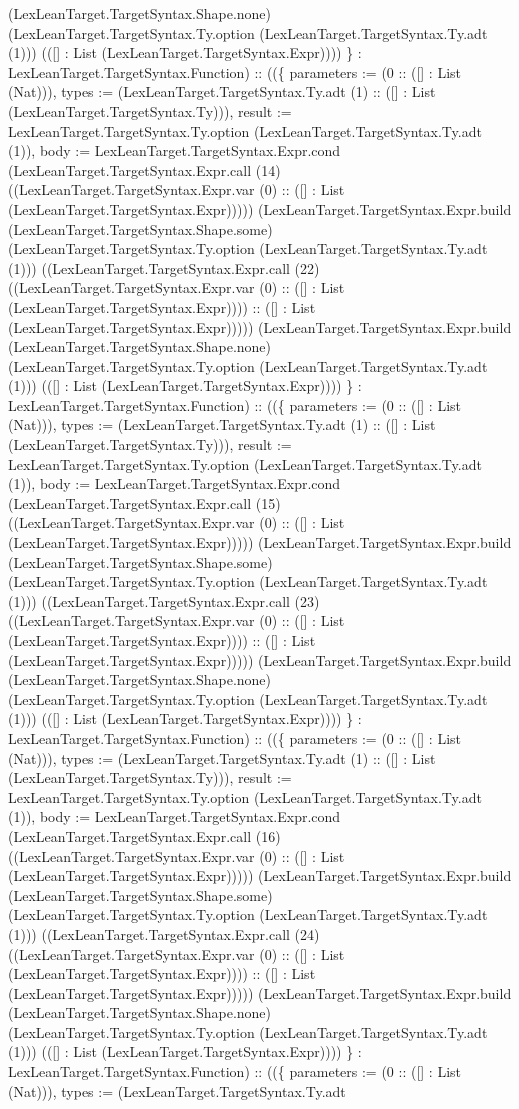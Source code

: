 \documentclass[11pt]{article}
\begin{document}
(LexLeanTarget.TargetSyntax.Shape.none) (LexLeanTarget.TargetSyntax.Ty.option (LexLeanTarget.TargetSyntax.Ty.adt (1))) (([] : List (LexLeanTarget.TargetSyntax.Expr)))) \} : LexLeanTarget.TargetSyntax.Function) :: ((\{ parameters := (0 :: ([] : List (Nat))), types := (LexLeanTarget.TargetSyntax.Ty.adt (1) :: ([] : List (LexLeanTarget.TargetSyntax.Ty))), result := LexLeanTarget.TargetSyntax.Ty.option (LexLeanTarget.TargetSyntax.Ty.adt (1)), body := LexLeanTarget.TargetSyntax.Expr.cond (LexLeanTarget.TargetSyntax.Expr.call (14) ((LexLeanTarget.TargetSyntax.Expr.var (0) :: ([] : List (LexLeanTarget.TargetSyntax.Expr))))) (LexLeanTarget.TargetSyntax.Expr.build (LexLeanTarget.TargetSyntax.Shape.some) (LexLeanTarget.TargetSyntax.Ty.option (LexLeanTarget.TargetSyntax.Ty.adt (1))) ((LexLeanTarget.TargetSyntax.Expr.call (22) ((LexLeanTarget.TargetSyntax.Expr.var (0) :: ([] : List (LexLeanTarget.TargetSyntax.Expr)))) :: ([] : List (LexLeanTarget.TargetSyntax.Expr))))) (LexLeanTarget.TargetSyntax.Expr.build (LexLeanTarget.TargetSyntax.Shape.none) (LexLeanTarget.TargetSyntax.Ty.option (LexLeanTarget.TargetSyntax.Ty.adt (1))) (([] : List (LexLeanTarget.TargetSyntax.Expr)))) \} : LexLeanTarget.TargetSyntax.Function) :: ((\{ parameters := (0 :: ([] : List (Nat))), types := (LexLeanTarget.TargetSyntax.Ty.adt (1) :: ([] : List (LexLeanTarget.TargetSyntax.Ty))), result := LexLeanTarget.TargetSyntax.Ty.option (LexLeanTarget.TargetSyntax.Ty.adt (1)), body := LexLeanTarget.TargetSyntax.Expr.cond (LexLeanTarget.TargetSyntax.Expr.call (15) ((LexLeanTarget.TargetSyntax.Expr.var (0) :: ([] : List (LexLeanTarget.TargetSyntax.Expr))))) (LexLeanTarget.TargetSyntax.Expr.build (LexLeanTarget.TargetSyntax.Shape.some) (LexLeanTarget.TargetSyntax.Ty.option (LexLeanTarget.TargetSyntax.Ty.adt (1))) ((LexLeanTarget.TargetSyntax.Expr.call (23) ((LexLeanTarget.TargetSyntax.Expr.var (0) :: ([] : List (LexLeanTarget.TargetSyntax.Expr)))) :: ([] : List (LexLeanTarget.TargetSyntax.Expr))))) (LexLeanTarget.TargetSyntax.Expr.build (LexLeanTarget.TargetSyntax.Shape.none) (LexLeanTarget.TargetSyntax.Ty.option (LexLeanTarget.TargetSyntax.Ty.adt (1))) (([] : List (LexLeanTarget.TargetSyntax.Expr)))) \} : LexLeanTarget.TargetSyntax.Function) :: ((\{ parameters := (0 :: ([] : List (Nat))), types := (LexLeanTarget.TargetSyntax.Ty.adt (1) :: ([] : List (LexLeanTarget.TargetSyntax.Ty))), result := LexLeanTarget.TargetSyntax.Ty.option (LexLeanTarget.TargetSyntax.Ty.adt (1)), body := LexLeanTarget.TargetSyntax.Expr.cond (LexLeanTarget.TargetSyntax.Expr.call (16) ((LexLeanTarget.TargetSyntax.Expr.var (0) :: ([] : List (LexLeanTarget.TargetSyntax.Expr))))) (LexLeanTarget.TargetSyntax.Expr.build (LexLeanTarget.TargetSyntax.Shape.some) (LexLeanTarget.TargetSyntax.Ty.option (LexLeanTarget.TargetSyntax.Ty.adt (1))) ((LexLeanTarget.TargetSyntax.Expr.call (24) ((LexLeanTarget.TargetSyntax.Expr.var (0) :: ([] : List (LexLeanTarget.TargetSyntax.Expr)))) :: ([] : List (LexLeanTarget.TargetSyntax.Expr))))) (LexLeanTarget.TargetSyntax.Expr.build (LexLeanTarget.TargetSyntax.Shape.none) (LexLeanTarget.TargetSyntax.Ty.option (LexLeanTarget.TargetSyntax.Ty.adt (1))) (([] : List (LexLeanTarget.TargetSyntax.Expr)))) \} : LexLeanTarget.TargetSyntax.Function) :: ((\{ parameters := (0 :: ([] : List (Nat))), types := (LexLeanTarget.TargetSyntax.Ty.adt 
\end{document}
